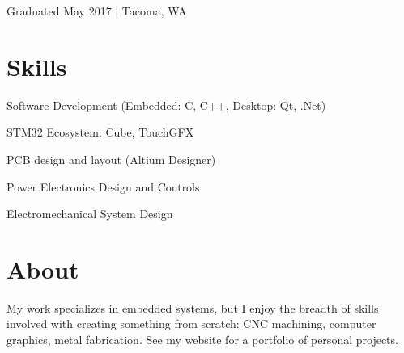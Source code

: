 \documentclass[letterpaper]{deedy-resume} %
\begin{document}
\begin{minipage}[t]{0.33\textwidth}

Graduated May 2017 | Tacoma, WA

\sectionspace %

\section{Skills}
\sectionspace %

\begin{tightitemize}

\item
Software Development \newline(Embedded: C, C++, \newline Desktop: Qt, .Net)

\item
STM32 Ecosystem: Cube, TouchGFX

\item
PCB design and layout (Altium Designer)

\item
Power Electronics Design and Controls

\item
Electromechanical System Design

\end{tightitemize}

\sectionspace %

\section{About} 
\sectionspace %
My work specializes in embedded systems, but I enjoy the breadth of skills involved with creating something from scratch: CNC machining, computer graphics, metal fabrication.  See my website for a portfolio of personal projects.
\end{minipage} %
\hfill
%
%
\end{document}

